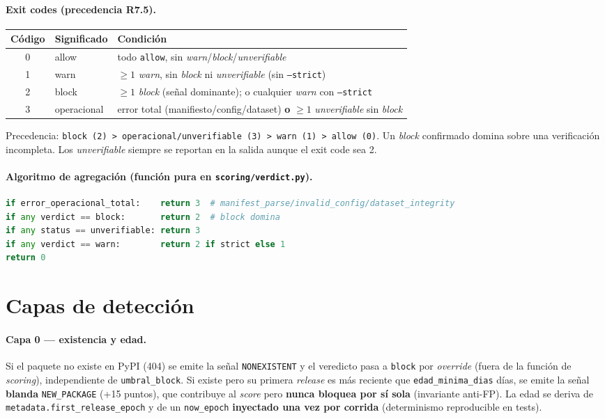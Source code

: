 \documentclass[11pt,a4paper]{article}
\begin{document}
\paragraph{Exit codes (precedencia R7.5).}
\begin{center}
\small
\begin{tabular}{@{}cll@{}}
\toprule
\textbf{Código} & \textbf{Significado} & \textbf{Condición} \\
\midrule
0 & allow & todo \texttt{allow}, sin \emph{warn}/\emph{block}/\emph{unverifiable} \\
1 & warn & $\geq 1$ \emph{warn}, sin \emph{block} ni \emph{unverifiable} (sin \texttt{--strict}) \\
2 & block & $\geq 1$ \emph{block} (señal dominante); o cualquier \emph{warn} con \texttt{--strict} \\
3 & operacional & error total (manifiesto/config/dataset) \textbf{o} $\geq 1$ \emph{unverifiable} sin \emph{block} \\
\bottomrule
\end{tabular}
\end{center}

\noindent Precedencia: \texttt{block (2) > operacional/unverifiable (3) > warn (1) > allow (0)}.
Un \emph{block} confirmado domina sobre una verificación incompleta. Los \emph{unverifiable}
siempre se reportan en la salida aunque el exit code sea 2.

\paragraph{Algoritmo de agregación (función pura en \texttt{scoring/verdict.py}).}
\begin{lstlisting}[language=Python]
if error_operacional_total:    return 3  # manifest_parse/invalid_config/dataset_integrity
if any verdict == block:       return 2  # block domina
if any status == unverifiable: return 3
if any verdict == warn:        return 2 if strict else 1
return 0
\end{lstlisting}

\section{Capas de detección}

\paragraph{Capa 0 --- existencia y edad.} Si el paquete no existe en PyPI (404) se
emite la señal \texttt{NONEXISTENT} y el veredicto pasa a \texttt{block} por
\emph{override} (fuera de la función de \emph{scoring}), independiente de
\texttt{umbral_block}. Si existe pero su primera \emph{release} es más reciente que
\texttt{edad_minima_dias} días, se emite la señal \textbf{blanda}
\texttt{NEW_PACKAGE} (+15 puntos), que contribuye al \emph{score} pero
\textbf{nunca bloquea por sí sola} (invariante anti-FP). La edad se deriva de
\texttt{metadata.first_release_epoch} y de un \texttt{now_epoch}
\textbf{inyectado una vez por corrida} (determinismo reproducible en tests).
\end{document}
